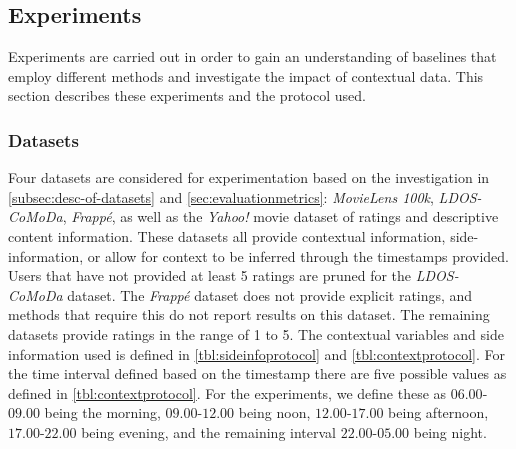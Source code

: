 \subsection{Experiments}\label{subsec:experimentprotocol}
Experiments are carried out in order to gain an understanding of baselines that employ different methods and investigate the impact of contextual data.
This section describes these experiments and the protocol used.

\subsubsection{Datasets}
Four datasets are considered for experimentation based on the investigation in \autoref{subsec:desc-of-datasets} and \autoref{sec:evaluationmetrics}: \textit{MovieLens 100k}, \textit{LDOS-CoMoDa}, \textit{Frappé}, as well as the \textit{Yahoo!} movie dataset of ratings and descriptive content information\cite{yahoo-movie}.
These datasets all provide contextual information, side-information, or allow for context to be inferred through the timestamps provided.
Users that have not provided at least 5 ratings are pruned for the \textit{LDOS-CoMoDa} dataset.
The \textit{Frappé} dataset does not provide explicit ratings, and methods that require this do not report results on this dataset.
The remaining datasets provide ratings in the range of 1 to 5.
The contextual variables and side information used is defined in \autoref{tbl:sideinfoprotocol} and \autoref{tbl:contextprotocol}.
For the time interval defined based on the timestamp there are five possible values as defined in \autoref{tbl:contextprotocol}.
For the experiments, we define these as $06.00$-$09.00$ being the morning, $09.00$-$12.00$ being noon, $12.00$-$17.00$ being afternoon, $17.00$-$22.00$ being evening, and the remaining interval $22.00$-$05.00$ being night.
\\
